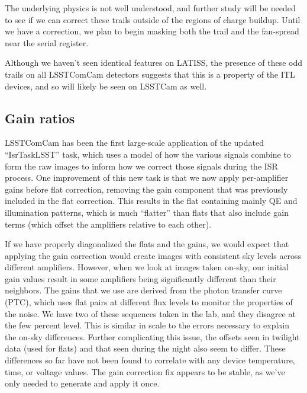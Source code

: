 The underlying physics is not well understood, and further study will be needed to see if we can correct these trails outside of the regions of charge buildup.
Until we have a correction, we plan to begin masking both the trail and the fan-spread near the serial register.

Although we haven't seen identical features on LATISS, the presence of these odd trails on all LSSTComCam detectors suggests that this is a property of the ITL devices, and so will likely be seen on LSSTCam as well.


\subsection{Gain ratios}

LSSTComCam has been the first large-scale application of the updated ``IsrTaskLSST'' task, which uses a model of how the various signals combine to form the raw images to inform how we correct those signals during the ISR process.
One improvement of this new task is that we now apply per-amplifier gains before flat correction, removing the gain component that was previously included in the flat correction.
This results in the flat containing mainly QE and illumination patterns, which is much ``flatter'' than flats that also include gain terms (which offset the amplifiers relative to each other).


If we have properly diagonalized the flats and the gains, we would expect that applying the gain correction would create images with consistent sky levels across different amplifiers.
However, when we look at images taken on-sky, our initial gain values result in some amplifiers being significantly different than their neighbors.
The gains that we use are derived from the photon transfer curve (PTC), which uses flat pairs at different flux levels to monitor the properties of the noise.
We have two of these sequences taken in the lab, and they disagree at the few percent level.
This is similar in scale to the errors necessary to explain the on-sky differences.
Further complicating this issue, the offsets seen in twilight data (used for flats) and that seen during the night also seem to differ.
These differences so far have not been found to correlate with any device temperature, time, or voltage values.
The gain correction fix appears to be stable, as we've only needed to generate and apply it once.

